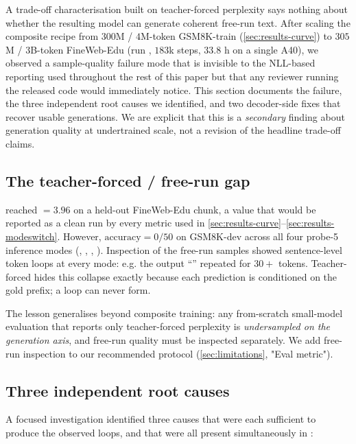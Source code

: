 A trade-off characterisation built on teacher-forced perplexity says
nothing about whether the resulting model can generate coherent free-run
text. After scaling the composite recipe from $300$M / $4$M-token
GSM8K-train (\textsection\ref{sec:results-curve}) to $305$M /
$3$B-token FineWeb-Edu (run , $183$k steps, $33.8$ h on a
single A40), we observed a sample-quality failure mode that is invisible
to the NLL-based reporting used throughout the rest of this paper but
that any reviewer running the released code would immediately notice.
This section documents the failure, the three independent root causes
we identified, and two decoder-side fixes that recover usable
generations. We are explicit that this is a \emph{secondary} finding
about generation quality at undertrained scale, not a revision of the
headline trade-off claims.

\subsection{The teacher-forced / free-run gap}
\label{sec:sq-gap}

 reached \arNLL{} $=3.96$ on a held-out FineWeb-Edu chunk, a
value that would be reported as a clean run by every metric used in
\textsection\ref{sec:results-curve}--\ref{sec:results-modeswitch}.
However, $\text{accuracy}=0/50$ on GSM8K-dev across all four probe-5
inference modes (, ,
, ). Inspection of the
free-run samples showed sentence-level token loops at every mode: e.g.
the  output ``'' repeated for $30+$ tokens.
Teacher-forced \arNLL{} hides this collapse exactly because each
prediction is conditioned on the gold prefix; a loop can never form.

The lesson generalises beyond composite training: any from-scratch
small-model evaluation that reports only teacher-forced perplexity is
\emph{undersampled on the generation axis}, and free-run quality must
be inspected separately. We add free-run inspection to our recommended
protocol (\textsection\ref{sec:limitations}, "Eval metric").

\subsection{Three independent root causes}
\label{sec:sq-causes}

A focused investigation identified three causes that were each
sufficient to produce the observed loops, and that were all present
simultaneously in :

